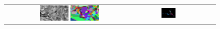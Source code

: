 \documentclass[10pt,twocolumn,letterpaper]{article}
\begin{document}
\begin{figure}[t]\footnotesize
	\vspace{-2.04in}
	\newcommand{\FigureWidth}{0.23\textwidth}
	\newcommand{\FigureShift}{\hspace{-0.42cm}}
	\newcommand{\figureShift}{\hspace{-0.3cm}}
	\begin{minipage}{\textwidth}
		\begin{center}
			\begin{tabular}{cccc}
				\FigureShift \includegraphics[width=\FigureWidth]{figures/schema/teaser-image.png} \includegraphics[width=\FigureWidth]{figures/schema/teaser-segmentation.png} &
				\FigureShift \includegraphics[width=\FigureWidth]{figures/schema/pre-multicut.png} &

\end{tabular}
\end{center}
\end{minipage}
\end{figure}
\end{document}
